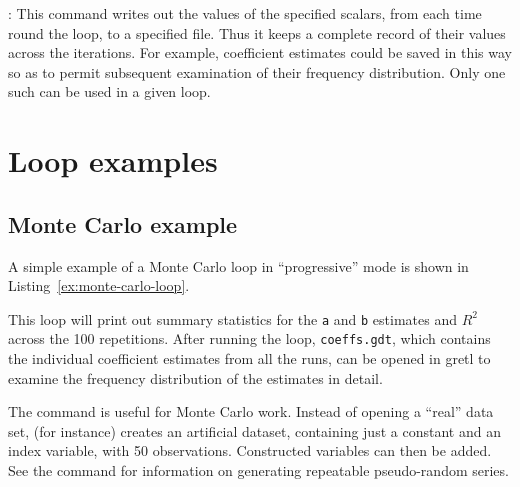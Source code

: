 : This command writes out the values of the specified
scalars, from each time round the loop, to a specified file.  Thus it
keeps a complete record of their values across the iterations.  For
example, coefficient estimates could be saved in this way so as to
permit subsequent examination of their frequency distribution.  Only
one such  can be used in a given loop.

\section{Loop examples}
\label{loop-examples}


\subsection{Monte Carlo example}
\label{loop-mc-example}

A simple example of a Monte Carlo loop in ``progressive'' mode is
shown in Listing~\ref{ex:monte-carlo-loop}.

\begin{script}[htbp]
\end{script}

This loop will print out summary statistics for the \texttt{a} and
\texttt{b} estimates and
$R^2$ across the 100 repetitions.  After running the loop,
\verb+coeffs.gdt+, which contains the individual coefficient estimates
from all the runs, can be opened in gretl to examine the frequency
distribution of the estimates in detail.

The  command is useful for Monte Carlo work.  Instead of
opening a ``real'' data set,  (for instance) creates
an artificial dataset, containing just a constant and an index
variable, with 50 observations. Constructed variables can then be
added.  See the  command for information on generating
repeatable pseudo-random series.

